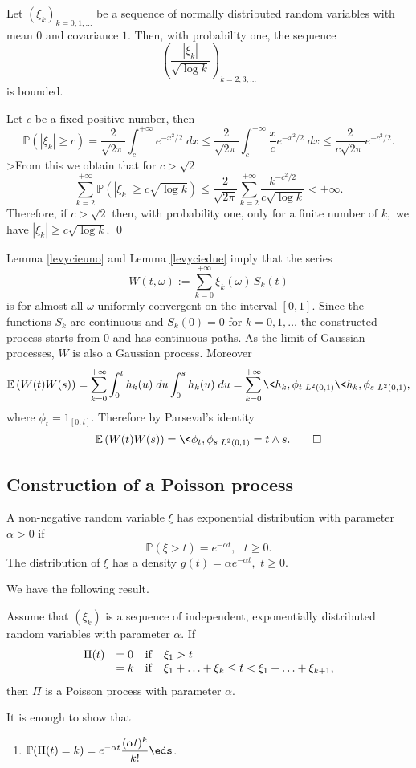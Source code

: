 \documentclass[preprint]{imsart}
\def\P{\mathbb P}
\def\E{\mathbb E}
\def\ds{\displaystyle}
\begin{document}
{\begin{Lemma}\label{levyciedue}
Let $(\xi_k)_{k=0,1,\ldots}$ be a sequence of normally
distributed random variables with mean $0$ and covariance
$1$. Then, with probability one, the sequence
$$
\left(\frac{|\xi_k|}{\sqrt{\log k}}\right)_{k=2,3,\ldots}
$$
is bounded.
\end{Lemma}

Let $c$ be a fixed positive number, then
$$
\P(|\xi_k|\ge c) =\frac{2}{\sqrt{2\pi}}\int_c^{+\infty}
e^{-x^2/2}\; dx \leq
\frac{2}{\sqrt{2\pi}}\int_c^{+\infty}\frac{x}{c}
e^{-x^2/2}\; dx \leq
\frac{2}{c\sqrt{2\pi}}e^{-c^2/2}.
$$
>From this we obtain that for $c>\sqrt{2}$
$$
\sum_{k=2}^{+\infty} \P(|\xi_k|\ge c\sqrt{\log k})
\le
 \frac{2}{\sqrt{2\pi}} \sum_{k=2}^{+\infty}
 \frac{k^{-c^2/2}}{c\sqrt{\log k}}<+\infty.
 $$
Therefore, if $c>\sqrt{2}$ then, with probability one, only for a
finite number of $k,$ we have $|\xi_k|\ge c\sqrt{\log k}$.
\qed

Lemma \ref{levycieuno} and Lemma \ref{levyciedue} imply that
the series
$$
W(t,\omega):=
\sum_{k=0}^{+\infty} \xi_k(\omega)\, S_k(t)
$$
is for almost all $\omega$ uniformly convergent on the interval
$[0,1]$. Since the functions $S_k$ are continuous and $S_k(0)=0$
for $k=0,1,\ldots$ the constructed process starts from $0$ and has
continuous paths. As the limit of Gaussian processes, $W$ is also
a Gaussian process. Moreover
$$
\E\,(W(t)W(s))=\sum_{k=0}^{+\infty} \int_0^th_k(u)\; du
 \int_0^sh _k(u)\; du
=\sum_{k=0}^{+\infty} \<h_k,\phi_t\>_{L^2(0,1)}
\<h_k,\phi_s\>_{L^2(0,1)},
$$
where $\phi_t=1_{[0,t]}$. Therefore by Parseval's identity
$$\E\,(W(t)W(s))=\<\phi_t,\phi_s\>_{L^2(0,1)}=t\wedge s.
\qed
$$
\subsection{Construction of a  Poisson process}
A non-negative random variable $\xi$ has exponential distribution with parameter $\alpha > 0$ if
$$
\P(\xi > t )=  e^{- \alpha t},\,\,\,\, t\geq 0.
$$
The distribution of $\xi$ has a density $g(t) = \alpha e^{- \alpha t},\,\,t\geq 0.$
\vspace{2mm}

\noindent We have the following result.

\begin{Proposition}
Assume that $(\xi_k)$ is a sequence of independent, exponentially distributed random variables with parameter $\alpha$.
If
$$
  \begin{array}{llll}\label{*}
    \Pi(t) & =  0& {\rm if} & \xi_1>t \\
      & = k      & {\rm if }& \xi_1+\ldots+\xi_k \leq t<
       \xi_1+\ldots+ \xi_{k+1},
  \end{array}
$$
then $\Pi$ is a Poisson process with parameter $\alpha$.
\end{Proposition}
It is enough to  show that
\begin{enumerate}
  \item[(i)] $\P(\Pi(t) =k) =
   e^{-\alpha t}\ds\frac{(\alpha t)^k}{k!}\eds$.


\end{enumerate}}
\end{document}
